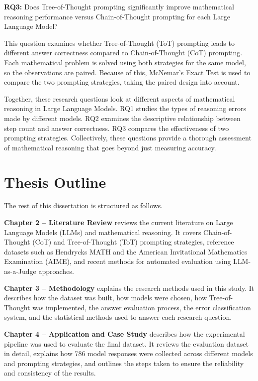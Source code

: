 \textbf{RQ3:} Does Tree-of-Thought prompting significantly improve
mathematical reasoning performance versus Chain-of-Thought prompting for
each Large Language Model?

This question examines whether Tree-of-Thought (ToT) prompting leads to
different answer correctness compared to Chain-of-Thought (CoT) prompting.
Each mathematical problem is solved using both strategies for the same
model, so the observations are paired. Because of this, McNemar's Exact
Test is used to compare the two prompting strategies, taking the paired
design into account.

Together, these research questions look at different aspects of
mathematical reasoning in Large Language Models. RQ1 studies the types of
reasoning errors made by different models. RQ2 examines the descriptive
relationship between step count and answer correctness. RQ3 compares the
effectiveness of two prompting strategies. Collectively, these questions
provide a thorough assessment of mathematical reasoning that goes beyond
just measuring accuracy.

\section{Thesis Outline}

The rest of this dissertation is structured as follows.

\textbf{Chapter 2 -- Literature Review} reviews the current literature on
Large Language Models (LLMs) and mathematical reasoning. It covers
Chain-of-Thought (CoT) and Tree-of-Thought (ToT) prompting strategies,
reference datasets such as Hendrycks MATH and the American Invitational
Mathematics Examination (AIME), and recent methods for automated
evaluation using LLM-as-a-Judge approaches.

\textbf{Chapter 3 -- Methodology} explains the research
methods used in this study. It describes how the dataset was built, how
models were chosen, how Tree-of-Thought was implemented, the answer
evaluation process, the error classification system, and the statistical
methods used to answer each research question.

\textbf{Chapter 4 -- Application and Case Study} describes how the
experimental pipeline was used to evaluate the final dataset. It reviews
the evaluation dataset in detail, explains how 786 model responses were
collected across different models and prompting strategies, and outlines
the steps taken to ensure the reliability and consistency of the results.

